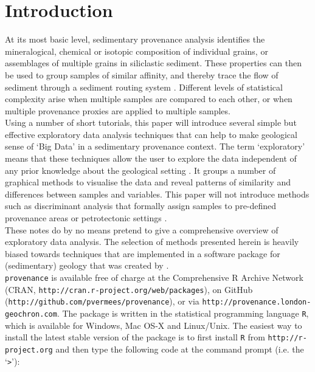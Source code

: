 \documentclass[11pt]{article}
\begin{document}
\section{Introduction}

At its most basic level, sedimentary provenance analysis identifies
the mineralogical, chemical or isotopic composition of individual
grains, or assemblages of multiple grains in siliclastic
sediment. These properties can then be used to group samples of
similar affinity, and thereby trace the flow of sediment through a
sediment routing system \citep[e.g.,][]{morton1991, weltje2004,
  gerdes2006, rittner2016, mazumder2017}. Different levels of
statistical complexity arise when multiple samples are compared to
each other, or when multiple provenance proxies are applied to
multiple samples.\\

Using a number of short tutorials, this paper will introduce several
simple but effective exploratory data analysis techniques that can
help to make geological sense of `Big Data' in a sedimentary
provenance context. The term `exploratory' means that these techniques
allow the user to explore the data independent of any prior knowledge
about the geological setting \citep{tukey1977, dutoit1986, kenkel2006,
  martinez2017}.  It groups a number of graphical methods to visualise
the data and reveal patterns of similarity and differences between
samples and variables.  This paper will not introduce methods such as
discriminant analysis that formally assign samples to pre-defined
provenance areas or petrotectonic settings \citep{bhatia1983,
  bhatia1986}.\\

These notes do by no means pretend to give a comprehensive overview of
exploratory data analysis. The selection of methods presented herein
is heavily biased towards techniques that are implemented in a
software package for (sedimentary) geology that was created by
\citet{vermeesch2016a}.\\

\texttt{provenance} is available free of charge at the Comprehensive R
Archive Network (CRAN,
\texttt{http://cran.}\allowbreak\texttt{r-project.org/}\allowbreak\texttt{web/}\allowbreak\texttt{packages}),
on GitHub
(\texttt{http://github.}\allowbreak\texttt{com/pvermees/provenance}),
or via
\texttt{http://provenance.}\allowbreak\texttt{london-geochron.}\texttt{com}. The
package is written in the statistical programming language \texttt{R},
which is available for Windows, Mac OS-X and Linux/Unix. The easiest
way to install the latest stable version of the package is to first
install \texttt{R} from
\texttt{http://r-project.}\allowbreak\texttt{org} and then type the
following code at the command prompt (i.e. the `\verb|>|'):
\end{document}
